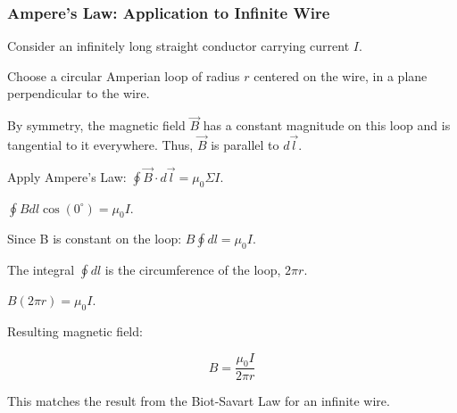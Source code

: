 \transfade[duration=0.5]

\begin{frame}[t]
    \frametitle{\textcolor{deepnavy}{\textbf{Ampere's Law: Application to Infinite Wire}}}
    \renewcommand{\familydefault}{\rmdefault}
    \small

      \item<+-> Consider an infinitely long straight conductor carrying current $I$.
      \item<+-> Choose a circular Amperian loop of radius $r$ centered on the wire, in a plane perpendicular to the wire.
      \item<+-> By symmetry, the magnetic field $\vec{B}$ has a constant magnitude on this loop and is tangential to it everywhere.   Thus, $\vec{B}$ is parallel to $d\vec{l}$.

      \item<+-> Apply Ampere's Law: $\oint \vec{B} \cdot d\vec{l} = \mu_0 \Sigma I$.
      \item<+-> $\oint B dl \cos(0^\circ) = \mu_0 I$.
      \item<+-> Since B is constant on the loop: $B \oint dl = \mu_0 I$.
      \item<+-> The integral $\oint dl$ is the circumference of the loop, $2\pi r$.
      \item<+-> $B (2\pi r) = \mu_0 I$.

    \item<+-> Resulting magnetic field:
        \begin{tcolorbox}[colback=blue!5,colframe=blue!80,boxrule=0.5pt,arc=1mm,boxsep=1pt]
        \begin{equation*}
             B = \frac{\mu_0 I}{2\pi r}
        \end{equation*}
        \end{tcolorbox}
          This matches the result from the Biot-Savart Law for an infinite wire.
\end{frame}


\transfade[duration=0.5]

